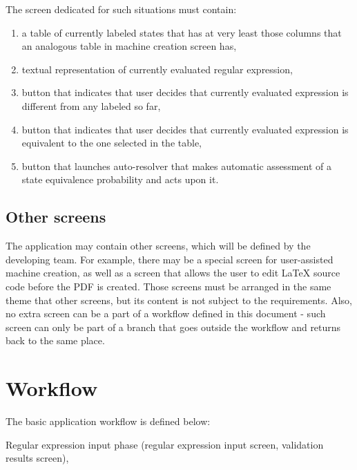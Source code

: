\documentclass{article}
\begin{document}
The screen dedicated for such situations must contain:
\begin{enumerate}

  \item a table of currently labeled states that has at very least those columns that an analogous
  table in machine creation screen has,

  \item textual representation of currently evaluated regular expression,

  \item button that indicates that user decides that currently evaluated expression is different
  from any labeled so far,

  \item button that indicates that user decides that currently evaluated expression is equivalent to
  the one selected in the table,

  \item button that launches auto-resolver that makes automatic assessment of a state equivalence
  probability and acts upon it.

\end{enumerate}

\subsection{Other screens}

The application may contain other screens, which will be defined by the developing team. For
example, there may be a special screen for user-assisted machine creation, as well as a screen that
allows the user to edit \LaTeX{} source code before the PDF is created. Those screens must be
arranged in the same theme that other screens, but its content is not subject to the requirements.
Also, no extra screen can be a part of a workflow defined in this document - such screen can only be
part of a branch that goes outside the workflow and returns back to the same place.

\section{Workflow}

The basic application workflow is defined below:

\vspace{10pt}
Regular expression input phase (regular expression input screen, validation results screen),
\end{document}

